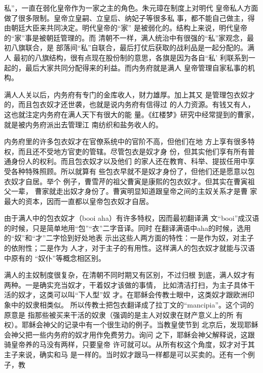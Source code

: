 私”，一直在弱化皇帝作为一家之主的角色。朱元璋在制度上对明代%
皇帝私人方面做了很多限制。皇帝立皇嗣、立皇后、纳妃子等很多私%
事，都不能自己做主，得由朝廷大臣来共同决定。明代皇帝的“家”%
是被弱化的。结构上来说，明代皇帝的“家”事是被朝廷管理的。而%
清朝不一样，满人统治中有很强的“私”家观念，最初八旗联合，是%
部落间“私”自联合，最后打仗后获取的战利品是一起分配的。满人%
最初的八旗结构，很有点现在股份制的意思，各旗是因为各自“私’%
利联系到一起的，最后大家共同分配得来的利益。而内务府就是满人%
皇帝管理自家私事的机构。%
\par
满人人关以后，内务府有专门的金库收人，财力雄厚。加上其又%
是管理包衣奴才的，而且包衣奴才还世袭，也就是说内务府有信得过%
的人力资源。有钱又有人，这也就注定内务府在满人天下有很大的能%
量。《红楼梦》研究中经常提到的曹家，就是被内务府派出去管理江%
南纺织和盐务收人的。%
\par
内务府里的许多包衣奴才在官僚系统中的官阶不高，但他们在地%
方上享有很多特权，而且还不受地方官吏的管辖。尽管包衣是奴才身%
份，但其实他们享有所有普通身份人的权利。而且包衣奴才以及他们%
的家人还在教育、科举、提拔任用中享受各种特殊照顾。所以就算有%
些包衣早就不是奴才身份了，但他们还是愿意以包衣奴才自居。举个%
例子，曹雪芹的祖父曹寅是康熙的包衣奴才。但其实在曹寅祖父一辈，%
曹家就走出奴才身份了。曹寅明显知道跟皇帝之间的主奴关系才是曹%
家最大的资本，因而一直都以皇帝包衣奴才自居。%
\par
由于满人中的包衣奴才（booi aha）有许多特权，因而最初翻译满%
文“booi”成汉语的时候，只是简单地用“包”“衣”二字音译。同时%
在翻译满语中aha的时候，选用的“奴”和“才”二字恰到好处地表%
示出这些人两方面的特性：一是作为奴，对主子的依附性；二是作为%
人才，对于主子的有用性。这样满人的包衣奴才就能与汉语中原有的%
“奴仆”等概念相区别。%
\par
满人的主奴制度很复杂，在清朝不同时期又有区别，不过归根%
到底，满人奴才有两种。一是确实充当奴才，干着奴才该做的事情，%
比如清洁打扫，为主子具体干活的奴才，这类可以叫“下人型”奴%
才。在耶稣会传教士眼中，这类奴才跟欧洲印象中的奴隶相类似。%
所以传教士把包衣翻译成了拉丁文的“mancipia”。这个词的原意是%
指那些被买来干活的奴隶（强调的是主人对奴隶在财产意义上的所%
有权）。耶稣会神父的记录中有一个很生动的例子。当教皇使节到%
北京后，发现耶稣会神父把一些内务府的奴才用作免费劳力。询问%
之下，耶稣会神父解释说，这跟骑皇帝养的马没有两样，只要皇帝%
许可就可以。从所有权这个角度，奴才对于其主子来说，确实和马%
是一样的。当时奴才跟马一样都是可以买卖的。还有一个例子，教%
